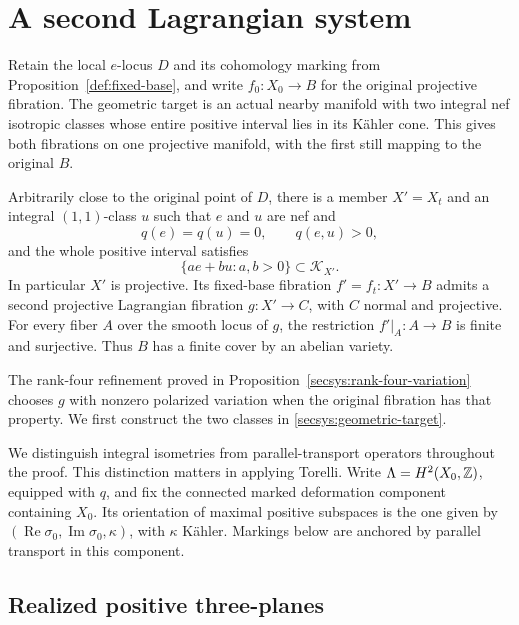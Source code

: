 \section{A second Lagrangian system}
\label{secsys:section}
\label{sec:second-system}

Retain the local $e$-locus $D$ and its cohomology marking from
Proposition~\ref{def:fixed-base}, and write $f_0:X_0\to B$ for the
original projective fibration.  The geometric target is an actual nearby
manifold with two integral nef isotropic classes whose entire positive
interval lies in its K\"ahler cone.  This gives both fibrations on one
projective manifold, with the first still mapping to the original $B$.

\begin{proposition}\label{secsys:second-system}
Arbitrarily close to the original point of $D$, there is a member
$X'=X_t$ and an integral $(1,1)$-class $u$ such that $e$ and $u$ are
nef and
\[
                  q(e)=q(u)=0,\qquad q(e,u)>0,
\]
and the whole positive interval satisfies
\begin{equation}\label{secsys:geometric-target}
             \{a e+b u:a,b>0\}\subset\mathcal K_{X'}.
\end{equation}
In particular $X'$ is projective.  Its fixed-base fibration
$f'=f_t:X'\to B$ admits a second projective Lagrangian fibration
$g:X'\to C$, with $C$ normal and projective.  For every fiber $A$
over the smooth locus of $g$, the restriction $f'|_A:A\to B$ is
finite and surjective.  Thus $B$ has a finite cover by an abelian variety.
\end{proposition}

The rank-four refinement proved in
Proposition~\ref{secsys:rank-four-variation} chooses $g$ with nonzero
polarized variation when the original fibration has that property.
We first construct the two classes in
\eqref{secsys:geometric-target}.

We distinguish integral isometries from parallel-transport operators
throughout the proof.  This distinction matters in applying Torelli.
Write $\Lambda=H^2(X_0,\mathbb Z)$, equipped with $q$, and fix the connected
marked deformation component containing $X_0$.  Its orientation of maximal
positive subspaces is the one given by
$(\operatorname{Re}\sigma_0,\operatorname{Im}\sigma_0,\kappa)$, with
$\kappa$ K\"ahler.  Markings below are anchored by parallel transport
in this component.

\subsection{Realized positive three-planes}

